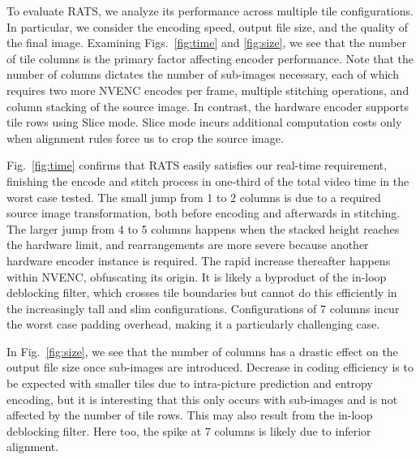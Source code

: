 To evaluate RATS, we analyze its performance across multiple tile configurations. In particular, we consider the encoding speed, output file size, and the quality of the final image.
%
Examining Figs.~\ref{fig:time} and \ref{fig:size}, we see that the number of tile columns is the primary factor affecting encoder performance. Note that the number of columns dictates the number of sub-images necessary, each of which requires two more NVENC encodes per frame, multiple stitching operations, and column stacking of the source image. In contrast, the hardware encoder supports tile rows using Slice mode. Slice mode incurs additional computation costs only when alignment rules force us to crop the source image.

Fig.~\ref{fig:time} confirms that RATS easily satisfies our real-time requirement, finishing the encode and stitch process in one-third of the total video time in the worst case tested.
The small jump from 1 to 2 columns is due to a required source image transformation, both before encoding and afterwards in stitching.
The larger jump from 4 to 5 columns happens when the stacked height reaches the hardware limit, and rearrangements are more severe because another hardware encoder instance is required.
The rapid increase thereafter happens within NVENC, obfuscating its origin.
It is likely a byproduct of the in-loop deblocking filter, which crosses tile boundaries but cannot do this efficiently in the increasingly tall and slim configurations. Configurations of 7 columns incur the worst case padding overhead, making it a particularly challenging case.


In Fig.~\ref{fig:size}, we see that the number of columns has a drastic effect on the output file size once sub-images are introduced. Decrease in coding efficiency is to be expected with smaller tiles due to intra-picture prediction and entropy encoding, but it is interesting that this only occurs with sub-images and is not affected by the number of tile rows.
This may also result from the in-loop deblocking filter.
Here too, the spike at 7 columns is likely due to inferior alignment.

